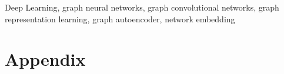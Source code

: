 \documentclass[journal]{IEEEtran}
\begin{document}
\begin{IEEEkeywords}
Deep Learning, graph neural networks, graph convolutional networks, graph representation learning, graph autoencoder, network embedding
\end{IEEEkeywords}






%
\IEEEpeerreviewmaketitle







%
\section*{Appendix}

\balance
\end{document}

